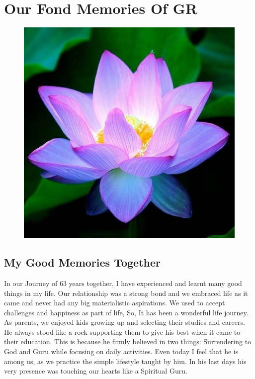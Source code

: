 \chapter[Our Fond Memories Of GR]{Our Fond Memories Of GR}\label{chap36}



\begin{figure}[H]
\centering
\includegraphics[scale=.3]{figures/chap23-fig1.eps}
\end{figure}

\section*{My Good Memories Together}

In our Journey of 63 years together, I have experienced and learnt many good things in my life. Our relationship was a strong bond and we embraced life as it came and never had any big materialistic aspirations. We used to accept challenges and happiness as part of life, So, It has been a wonderful life journey. As parents, we enjoyed kids growing up and selecting their studies and careers. He always stood like a rock supporting them to give his best when it came to their education. This is because he firmly believed in two things: Surrendering to God and Guru while focusing on daily activities. Even today I feel that he is among us, as we practice the simple lifestyle taught by him. In his last days his very presence was touching our hearts like a Spiritual Guru. 

